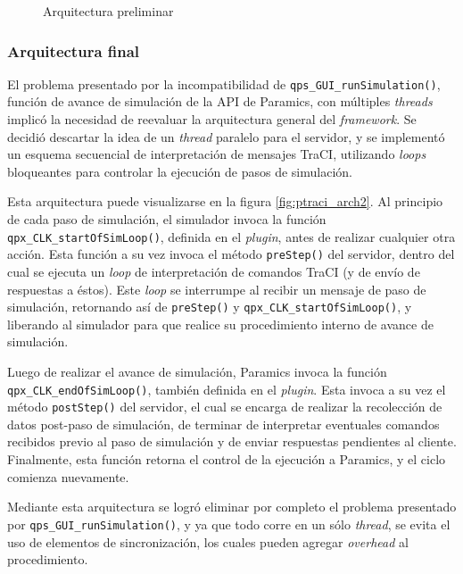 \begin{figure}[]
    \centering
    
    \caption{Arquitectura preliminar}
    \label{fig:ptraci_arch}
\end{figure}

\subsubsection{Arquitectura final} \label{sec:architecture:final}

El problema presentado por la incompatibilidad de \texttt{qps\_GUI\_runSimulation()}, función de avance de simulación de la API de Paramics, con múltiples \emph{threads} implicó la necesidad de reevaluar la arquitectura general del \emph{framework}. Se decidió descartar la idea de un \emph{thread} paralelo para el servidor, y se implementó un esquema secuencial de interpretación de mensajes TraCI, utilizando \emph{loops} bloqueantes para controlar la ejecución de pasos de simulación.

Esta arquitectura puede visualizarse en la figura \ref{fig:ptraci_arch2}. Al principio de cada paso de simulación, el simulador invoca la función \texttt{qpx\_CLK\_startOfSimLoop()}, definida en el \emph{plugin}, antes de realizar cualquier otra acción. Esta función a su vez invoca el método \texttt{preStep()} del servidor, dentro del cual se ejecuta un \emph{loop} de interpretación de comandos TraCI (y de envío de respuestas a éstos). Este \emph{loop} se interrumpe al recibir un mensaje de paso de simulación, retornando así de \texttt{preStep()} y \texttt{qpx\_CLK\_startOfSimLoop()}, y liberando al simulador para que realice su procedimiento interno de avance de simulación. 

Luego de realizar el avance de simulación, Paramics invoca la función \texttt{qpx\_CLK\_endOfSimLoop()}, también definida en el \emph{plugin}. Esta invoca a su vez el método \texttt{postStep()} del servidor, el cual se encarga de realizar la recolección de datos post-paso de simulación, de terminar de interpretar eventuales comandos recibidos previo al paso de simulación y de enviar respuestas pendientes al cliente. Finalmente, esta función retorna el control de la ejecución a Paramics, y el ciclo comienza nuevamente.

Mediante esta arquitectura se logró eliminar por completo el problema presentado por \texttt{qps\_GUI\_runSimulation()}, y ya que todo corre en un sólo \emph{thread}, se evita el uso de elementos de sincronización, los cuales pueden agregar \emph{overhead} al procedimiento.

